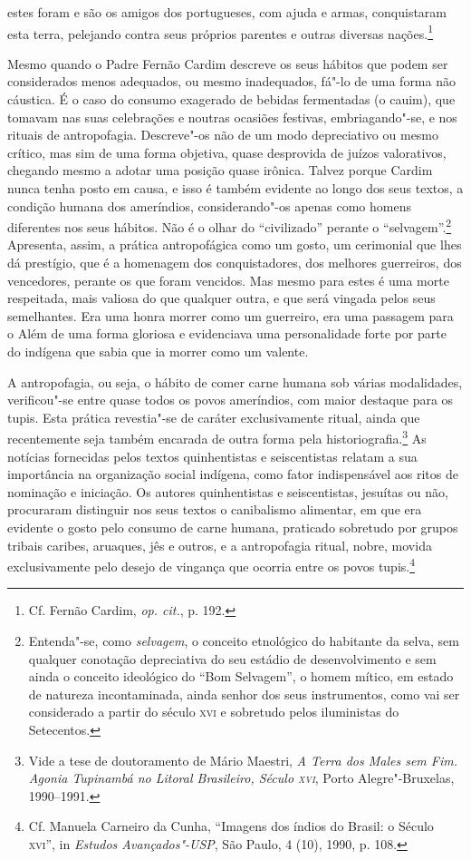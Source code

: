 \begin{hedraquote}
[\ldots{}] estes foram e são os amigos dos portugueses, com ajuda e
armas, conquistaram esta terra, pelejando contra seus próprios parentes
e outras diversas nações.\footnote{ Cf. Fernão Cardim, \textit{op. cit.}, p. 192.}
\end{hedraquote}

 Mesmo quando o Padre Fernão Cardim descreve os seus
hábitos que podem ser considerados menos adequados, ou mesmo
inadequados, fá"-lo de uma forma não cáustica. É o caso do consumo
exagerado de bebidas fermentadas (o cauim), que tomavam nas
suas celebrações e noutras ocasiões festivas, embriagando"-se, e nos
rituais de antropofagia. Descreve"-os não de um modo depreciativo ou
mesmo crítico, mas sim de uma forma objetiva, quase desprovida de
juízos valorativos, chegando mesmo a adotar uma posição quase irônica.
Talvez porque Cardim nunca tenha posto em causa, e isso é também
evidente ao longo dos seus textos, a condição humana dos ameríndios,
considerando"-os apenas como homens diferentes nos seus hábitos. Não é
o olhar do ``civilizado'' perante o ``selvagem''.\footnote{ Entenda"-se, 
como \textit{selvagem}, o conceito etnológico do habitante
da selva, sem qualquer conotação depreciativa do seu estádio de
desenvolvimento e sem ainda o conceito ideológico do ``Bom Selvagem'',
o homem mítico, em estado de natureza incontaminada, ainda senhor dos
seus instrumentos, como vai ser considerado a partir do século \textsc{xvi} e
sobretudo pelos iluministas do Setecentos.} Apresenta, assim, a 
prática antropofágica como um gosto, um cerimonial que lhes dá prestígio, que é a
homenagem dos conquistadores, dos melhores guerreiros, dos vencedores,
perante os que foram vencidos. Mas mesmo para estes é uma morte
respeitada, mais valiosa do que qualquer outra, e que será vingada
pelos seus semelhantes. Era uma honra morrer como um guerreiro, era uma
passagem para o Além de uma forma gloriosa e evidenciava uma
personalidade forte por parte do indígena que sabia que ia morrer como um valente.

 A antropofagia, ou seja, o hábito de comer carne humana sob várias
modalidades, verificou"-se entre quase todos os povos ameríndios, com
maior destaque para os tupis. Esta prática revestia"-se de caráter
exclusivamente ritual, ainda que recentemente seja também encarada de
outra forma pela historiografia.\footnote{ Vide a tese de
doutoramento de Mário Maestri, \textit{A Terra dos Males sem Fim.
Agonia Tupinambá no Litoral Brasileiro, Século \textsc{xvi}}, Porto
Alegre"-Bruxelas, 1990--1991.} As notícias fornecidas pelos textos
quinhentistas e seiscentistas relatam a sua importância na organização
social indígena, como fator indispensável aos ritos de nominação e
iniciação. Os autores quinhentistas e seiscentistas, jesuítas ou não,
procuraram distinguir nos seus textos o canibalismo alimentar, em que
era evidente o gosto pelo consumo de carne humana, praticado sobretudo
por grupos tribais caribes, aruaques, jês e outros, e a antropofagia
ritual, nobre, movida exclusivamente pelo desejo de vingança que
ocorria entre os povos tupis.\footnote{ Cf. Manuela Carneiro da
Cunha, ``Imagens dos índios do Brasil: o Século \textsc{xvi}'', in
\textit{Estudos Avançados"-USP}, São Paulo, 4 (10), 1990, p. 108.} 

